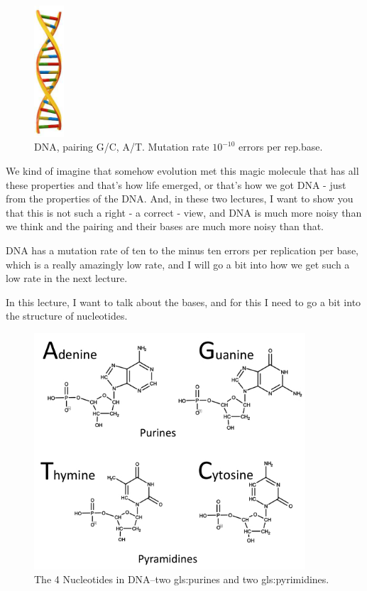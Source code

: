 \documentclass[]{article}
\begin{document}
\begin{figure}[H]
	\begin{center}
		\caption[DNA, pairing G/C, A/T.]{DNA, pairing G/C, A/T. Mutation rate $10^{-10}$ errors per rep.base. }\label{fig:DNA}
		\includegraphics[width=0.1\textwidth]{DNA}
	\end{center}
\end{figure}
We kind of imagine that
somehow evolution met this magic
molecule that has all these properties
and that's how life emerged,
or that's how we got DNA -
just from the properties of the DNA.
And, in these two lectures,
I want to show you
that this is not such a right -
a correct - view,
and DNA is much more noisy
than we think
and the pairing and their bases
are much more noisy than that.

DNA has a mutation rate
of ten to the minus ten errors
per replication per base,
which is a really amazingly low rate,
and I will go a bit into
how we get such a low rate
in the next lecture.

In this lecture, I want to talk about
the bases,
and for this I need to go a bit into
the structure of nucleotides.


\begin{figure}[H]
	\caption[The 4 Nucleotides in DNA]{The 4 Nucleotides in DNA--two \glspl{gls:purine} and two \glspl{gls:pyrimidine}.}\label{fig:Nucleotides} 
	\includegraphics[width=0.9\textwidth]{Nucleotides}
\end{figure}
\end{document}
